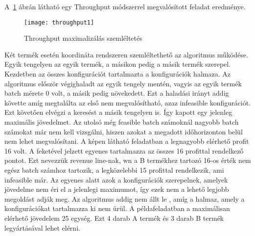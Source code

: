 A~\ref{throughput1} ábrán látható egy Throughput módszerrel megvalósított feladat eredménye.
\begin{figure}[H]
\begin{center}
\texttt{[image: throughput1]}
\caption{Throughput maximalizálás szemléltetés}
\label{throughput1}
\end{center}
\end{figure}
Két termék esetén koordináta rendszeren szemléltethető az algoritmus működése. Egyik tengelyen az egyik termék, a másikon pedig a másik termék szerepel. Kezdetben az összes konfigurációt tartalmazta a konfigurációk halmaza. Az algoritmus először végighaladt az egyik tengely mentén, vagyis az egyik termék batch mérete 0 volt, a másik pedig növekedett. Ezt a haladási irányt addig követte amíg megtalálta az első nem megvalósítható, azaz infeasible konfigurációt. Ezt követően elvégzi a keresést a másik tengelyen is. Így kapott egy jelenleg maximális jövedelmet. Az utolsó még feasible batch számoknál nagyobb batch számokat már nem kell vizsgálni, hiszen azokat a megadott időhorizonton belül nem lehet megvalósítani. A képen látható feladatban a legnagyobb elérhető profit 16 volt. A feketével jelzett egyenes tartalmazza az összes 16 profittal rendelkező pontot. Ezt nevezzük revenue line-nak, wn a B termékhez tartozó 16-os érték nem egész batch számhoz tartozik, a legközelebbi 15 profittal rendelkezik, ami infeasible már. Az egyenes alatt azok a konfigurációk szerepelnek, amelyek jövedelme nem éri el a jelenlegi maximumot, így ezek nem a lehető legjobb megoldást adják meg. Az algoritmus addig nem állt le , amíg a halmaz, amely a konfigurációkat tartalmazza ki nem ürül. A példafeladatban a maximálisan elérhető jövedelem 25 egység. Ezt 4 darab A termék és 3 darab B termék legyártásával lehet elérni.